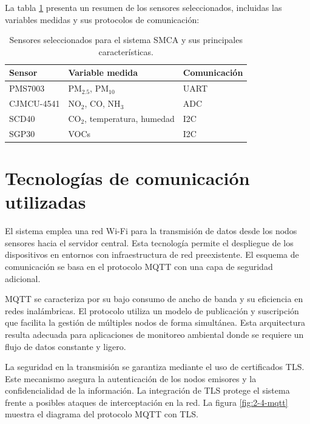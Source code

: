 La tabla \ref{tab:sensores} presenta un resumen de los sensores seleccionados, incluidas las variables medidas y sus protocolos de comunicación:

\begin{table}[h]
    \centering
    \caption[Resumen de sensores utilizados]{Sensores seleccionados para el sistema SMCA y sus principales características.}
    \label{tab:sensores}
    \begin{tabular}{p{3.5cm} p{5.5cm} p{2.5cm}}
        \toprule
        \textbf{Sensor} & \textbf{Variable medida} & \textbf{Comunicación} \\
        \midrule
        PMS7003 & PM$_{2.5}$, PM$_{10}$ & UART  \\
        CJMCU-4541 & NO$_2$, CO, NH$_3$ & ADC \\
        SCD40 & CO$_2$, temperatura, humedad & I2C \\
        SGP30 & VOCs & I2C \\
        \bottomrule
    \end{tabular}
\end{table}


\section{Tecnologías de comunicación utilizadas}

El sistema emplea una red Wi-Fi para la transmisión de datos desde los nodos sensores hacia el servidor central. Esta tecnología permite el despliegue de los dispositivos en entornos con infraestructura de red preexistente. El esquema de comunicación se basa en el protocolo MQTT con una capa de seguridad adicional.

MQTT se caracteriza por su bajo consumo de ancho de banda y su eficiencia en redes inalámbricas. El protocolo utiliza un modelo de publicación y suscripción que facilita la gestión de múltiples nodos de forma simultánea. Esta arquitectura resulta adecuada para aplicaciones de monitoreo ambiental donde se requiere un flujo de datos constante y ligero.

La seguridad en la transmisión se garantiza mediante el uso de certificados TLS. Este mecanismo asegura la autenticación de los nodos emisores y la confidencialidad de la información. La integración de TLS protege el sistema frente a posibles ataques de interceptación en la red. La figura \ref{fig:2-4-mqtt} muestra el diagrama del protocolo MQTT con TLS.

